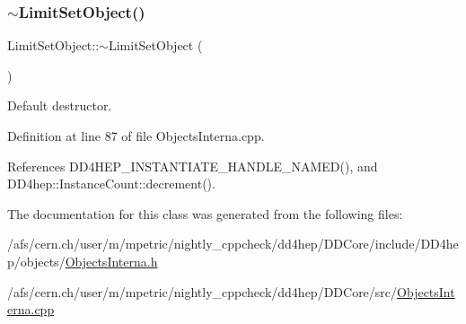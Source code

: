 \subsubsection{\texorpdfstring{$\sim$\+Limit\+Set\+Object()}{~LimitSetObject()}}
{\footnotesize\ttfamily Limit\+Set\+Object\+::$\sim$\+Limit\+Set\+Object (\begin{DoxyParamCaption}{ }\end{DoxyParamCaption})\hspace{0.3cm}{\ttfamily [virtual]}}



Default destructor. 



Definition at line 87 of file Objects\+Interna.\+cpp.



References D\+D4\+H\+E\+P\+\_\+\+I\+N\+S\+T\+A\+N\+T\+I\+A\+T\+E\+\_\+\+H\+A\+N\+D\+L\+E\+\_\+\+N\+A\+M\+E\+D(), and D\+D4hep\+::\+Instance\+Count\+::decrement().



The documentation for this class was generated from the following files\+:\begin{DoxyCompactItemize}
\item 
/afs/cern.\+ch/user/m/mpetric/nightly\+\_\+cppcheck/dd4hep/\+D\+D\+Core/include/\+D\+D4hep/objects/\hyperlink{_objects_interna_8h}{Objects\+Interna.\+h}\item 
/afs/cern.\+ch/user/m/mpetric/nightly\+\_\+cppcheck/dd4hep/\+D\+D\+Core/src/\hyperlink{_objects_interna_8cpp}{Objects\+Interna.\+cpp}\end{DoxyCompactItemize}
